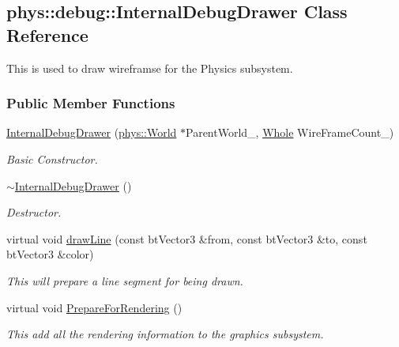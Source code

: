 \hypertarget{classphys_1_1debug_1_1InternalDebugDrawer}{
\subsection{phys::debug::InternalDebugDrawer Class Reference}
\label{classphys_1_1debug_1_1InternalDebugDrawer}
}


This is used to draw wireframse for the Physics subsystem.  


\subsubsection*{Public Member Functions}
\begin{DoxyCompactItemize}
\item 
\hyperlink{classphys_1_1debug_1_1InternalDebugDrawer_a0e701e00e1080fdadfcf35e9051789a3}{InternalDebugDrawer} (\hyperlink{classphys_1_1World}{phys::World} $\ast$ParentWorld\_\-, \hyperlink{namespacephys_a460f6bc24c8dd347b05e0366ae34f34a}{Whole} WireFrameCount\_)
\begin{DoxyCompactList}\small\item\em Basic Constructor. \item\end{DoxyCompactList}\item 
\hyperlink{classphys_1_1debug_1_1InternalDebugDrawer_a9b5cb5ec48541effddb305de12508323}{$\sim$InternalDebugDrawer} ()
\begin{DoxyCompactList}\small\item\em Destructor. \item\end{DoxyCompactList}\item 
virtual void \hyperlink{classphys_1_1debug_1_1InternalDebugDrawer_a8a35c3c80fddaaec8e21f737ed1b3938}{drawLine} (const btVector3 \&from, const btVector3 \&to, const btVector3 \&color)
\begin{DoxyCompactList}\small\item\em This will prepare a line segment for being drawn. \item\end{DoxyCompactList}\item 
virtual void \hyperlink{classphys_1_1debug_1_1InternalDebugDrawer_a1002293d223ca20e5bccc3c3412ce262}{PrepareForRendering} ()
\begin{DoxyCompactList}\small\item\em This add all the rendering information to the graphics subsystem. \item\end{DoxyCompactList}\item 

\end{DoxyCompactItemize}
